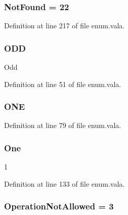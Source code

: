 \hypertarget{enum_8vala_a0cfc295e037d42309933d7471dcfd28e}{
\subsubsection[{Not\-Found}]{\setlength{\rightskip}{0pt plus 5cm}Not\-Found = 22}}\label{enum_8vala_a0cfc295e037d42309933d7471dcfd28e}


Definition at line 217 of file enum.\-vala.

\hypertarget{enum_8vala_af08bd4a17e637fa6824ffe427026744d}{
\subsubsection[{O\-D\-D}]{\setlength{\rightskip}{0pt plus 5cm}O\-D\-D}}\label{enum_8vala_af08bd4a17e637fa6824ffe427026744d}
Odd 

Definition at line 51 of file enum.\-vala.

\hypertarget{enum_8vala_a2cb8470634cc90a55800ee95f967eade}{
\subsubsection[{O\-N\-E}]{\setlength{\rightskip}{0pt plus 5cm}O\-N\-E}}\label{enum_8vala_a2cb8470634cc90a55800ee95f967eade}


Definition at line 79 of file enum.\-vala.

\hypertarget{enum_8vala_a5fa00e7f98097a9c0c059b5308a4b863}{
\subsubsection[{One}]{\setlength{\rightskip}{0pt plus 5cm}One}}\label{enum_8vala_a5fa00e7f98097a9c0c059b5308a4b863}
1 

Definition at line 133 of file enum.\-vala.

\hypertarget{enum_8vala_a40c3620637782663c2f6af59c8c9c7c5}{
\subsubsection[{Operation\-Not\-Allowed}]{\setlength{\rightskip}{0pt plus 5cm}Operation\-Not\-Allowed = 3}}\label{enum_8vala_a40c3620637782663c2f6af59c8c9c7c5}


